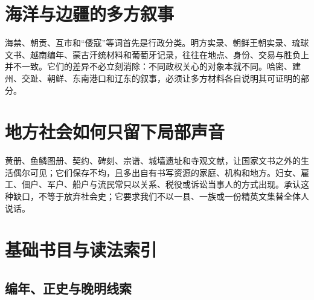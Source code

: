\section{海洋与边疆的多方叙事}

海禁、朝贡、互市和“倭寇”等词首先是行政分类。明方实录、朝鲜王朝实录、琉球文书、越南编年、蒙古汗统材料和葡萄牙记录，往往在地点、身份、交易与胜负上并不一致。它们的差异不必立刻消除：不同政权关心的对象本就不同。哈密、建州、交趾、朝鲜、东南港口和辽东的叙事，必须让多方材料各自说明其可证明的部分。

\section{地方社会如何只留下局部声音}

黄册、鱼鳞图册、契约、碑刻、宗谱、城墙遗址和寺观文献，让国家文书之外的生活偶尔可见；它们保存不均，且多出自有书写资源的家庭、机构和地方。妇女、雇工、佃户、军户、船户与流民常只以关系、税役或诉讼当事人的方式出现。承认这种缺口，不等于放弃社会史；它要求我们不以一县、一族或一份精英文集替全体人说话。

\section{基础书目与读法索引}
\label{sources:reading}

\subsection{编年、正史与晚明线索}

